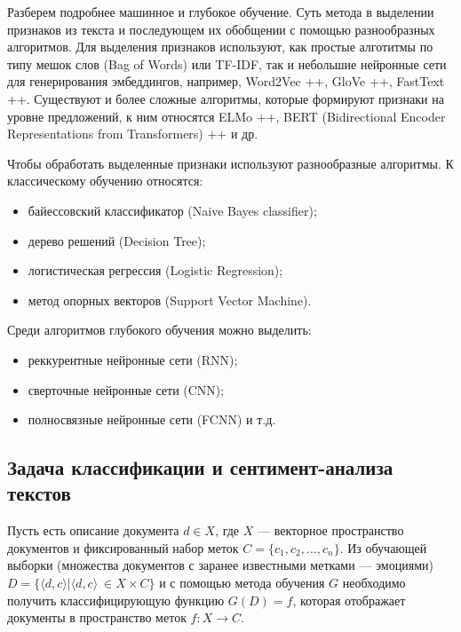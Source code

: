 \bigskip\par
Разберем подробнее машинное и глубокое обучение. Суть метода в выделении признаков из текста и последующем их
обобщении с помощью разнообразных алгоритмов. Для выделения признаков используют, как простые алготитмы по
типу мешок слов (Bag of Words) или TF-IDF, так и небольшие нейронные сети для генерирования эмбеддингов,
например, Word2Vec ++, GloVe ++, FastText ++. Существуют и более сложные алгоритмы, которые формируют признаки
на уровне предложений, к ним относятся ELMo ++, BERT (Bidirectional Encoder Representations from Transformers)
++ и др.

\bigskip\par
Чтобы обработать выделенные признаки используют разнообразные алгоритмы. К классическому обучению относятся:
\bigskip
\begin{itemize}
 \item байессовский классификатор (Naive Bayes classifier);
 \item дерево решений (Decision Tree);
 \item логистическая регрессия (Logistic Regression);
 \item метод опорных векторов (Support Vector Machine).
\end{itemize}

\bigskip\par
Среди алгоритмов глубокого обучения можно выделить:
\begin{itemize}
 \item реккурентные нейронные сети (RNN);
 \item сверточные нейронные сети (CNN);
 \item полносвязные нейронные сети (FCNN) и т.д.
\end{itemize}


\subsection{Задача классификации и сентимент-анализа текстов}

Пусть есть описание документа $d \in X$, где $X$ --- векторное пространство документов и фиксированный набор меток $C = \{c_1, c_2, \ldots, c_n\}$. Из обучающей выборки (множества документов с заранее известными метками --- эмоциями) $D = \{\langle d, c \rangle | \langle d, c \rangle\ \in X \times C\}$ и с помощью метода обучения $G$ необходимо получить классифицирующую функцию $G(D) = f$, которая отображает документы в пространство меток $f : X \to C$.



